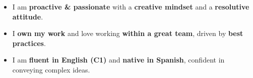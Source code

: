 \documentclass[10pt]{developercv} %
\begin{document}
\vspace{0.5cm}


\vspace{0.5cm}
\begin{minipage}[t]{1\textwidth} %
	\vspace{-\baselineskip} %
		\begin{itemize}
			\item I am \textbf{proactive \& passionate} with a \textbf{creative mindset} and a \textbf{resolutive attitude}.
			\item I \textbf{own my work} and love working \textbf{within a great team}, driven by \textbf{best practices}.
			\item I am \textbf{fluent in English (C1)} and \textbf{native in Spanish}, confident in conveying complex ideas.
		\end{itemize}
\end{minipage}
\hfill %



\end{document}
